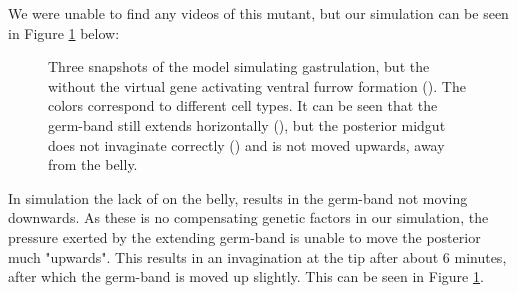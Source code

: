 We were unable to find any videos of this mutant, but our simulation can be seen in Figure \ref{fig:VFmutant} below:

\begin{figure}[H]
    \centering

    \caption{Three snapshots of the model simulating gastrulation, but the without the virtual gene activating ventral furrow formation (). The colors correspond to different cell types. It can be seen that the germ-band still extends horizontally (), but the posterior midgut does not invaginate correctly () and is not moved upwards, away from the belly.}
    \label{fig:VFmutant}
\end{figure}


In simulation the lack of  on the belly, results in the germ-band not moving downwards. As these is no compensating genetic factors in our simulation, the pressure exerted by the extending germ-band  is unable to move the posterior much "upwards". This results in an invagination at the tip after about 6 minutes, after which the germ-band is moved up slightly. This can be seen in Figure \ref{fig:VFmutant}.\\




